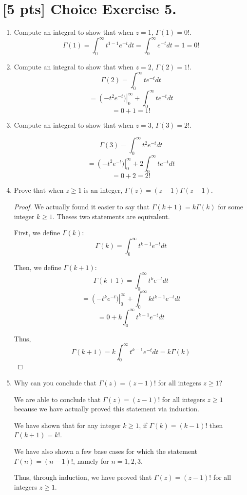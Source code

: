 \documentclass{article}
\begin{document}
\section*{[5 pts] Choice Exercise 5.}

\begin{enumerate}
    \item {
        Compute an integral to show that when \(z=1\), \(\Gamma(1) = 0!\).
        \[\Gamma(1) = \int_0^\infty{t^{1-1}e^{-t}} dt = \int_0^\infty{e^{-t}} dt = 1 = 0!\]
    }

    \item {
        Compute an integral to show that when \(z=2\), \(\Gamma(2)=1!\).
        \[\Gamma(2) = \int_0^\infty{te^{-t}} dt\]
        \[ = \left (-t^2 e^{-t}) \right|_0^\infty + \int_{0}^{\infty}{t e^{-t}} dt\]
        \[ = 0 + 1 = 1!\]
    }

    \item {
        Compute an integral to show that when \(z=3\), \(\Gamma(3)=2!\).

        \[ \Gamma(3) = \int_0^\infty{t^2e^{-t}} dt\]
        \[ = \left (-t^2e^{-t}) \right|_0^\infty + 2\int_{0}^{\infty}{te^{-t}} dt\]
        \[ = 0 + 2 = 2!\]
    }

    \item {
        Prove that when \(z \ge 1\) is an integer, \(\Gamma(z) = (z-1)\Gamma(z-1)\).

        \begin{proof}
            We actually found it easier to say that \(\Gamma(k+1) = k\Gamma(k)\) for
            some integer \(k \ge 1\). Theses two statements are equivalent.

            First, we define \(\Gamma(k)\):
            \[ \Gamma(k) = \int_{0}^{\infty}{t^{k-1}e^{-t}} dt\]

            Then, we define \(\Gamma(k+1)\):
            \[ \Gamma(k+1) = \int_{0}^{\infty}{t^ke^{-t}} dt\]
            \[ = \left (-t^ke^{-t}) \right|_0^\infty + \int_{0}^{\infty}{kt^{k-1}e^{-t}} dt\]
            \[ = 0 + k \int_{0}^{\infty}{t^{k-1}e^{-t}} dt\]

            Thus,
            \[ \Gamma(k+1) = k \int_{0}^{\infty}{t^{k-1}e^{-t}} dt = k\Gamma(k)\]
        \end{proof}
    }

    \item {
        Why can you conclude that \(\Gamma(z) = (z-1)!\) for all integers \(z \ge 1\)?

        We are able to conclude that \(\Gamma(z) = (z-1)!\) for all integers \(z \ge 1\)
        because we have actually proved this statement via induction.

        We have shown that for any integer \(k \ge 1\), if \(\Gamma(k) = (k-1)!\)
        then \(\Gamma(k+1) = k!\).

        We have also shown a few base cases for which the statement \(\Gamma(n) = (n-1)!\),
        namely for \(n = 1, 2, 3\).

        Thus, through induction, we have proved that \(\Gamma(z) = (z-1)!\) for all integers \(z \ge 1\).
    }
\end{enumerate}
\end{document}

